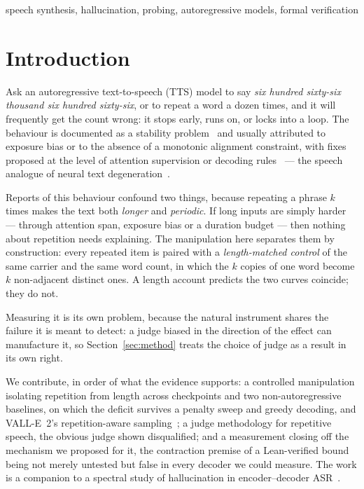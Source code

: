 \documentclass{article}
\begin{document}
\begin{keywords}
speech synthesis, hallucination, probing, autoregressive models,
formal verification
\end{keywords}

\section{Introduction}
\label{sec:intro}

Ask an autoregressive text-to-speech (TTS) model to say \emph{six hundred
sixty-six thousand six hundred sixty-six}, or to repeat a word a dozen times, and
it will frequently get the count wrong: it stops early, runs on, or locks into a
loop. The behaviour is documented as a stability
problem~\cite{song2024ellav,wang2023valle} and usually attributed to
exposure bias or to the absence of a monotonic alignment constraint, with fixes
proposed at the level of attention supervision or decoding
rules~\cite{xin2024ralle,du2024cosyvoice2,chen2024valle2} --- the speech analogue of neural text
degeneration~\cite{holtzman2020curious,welleck2020neural}.

Reports of this behaviour confound two things, because repeating a phrase $k$
times makes the text both \emph{longer} and \emph{periodic}. If long inputs are
simply harder --- through attention span, exposure bias or a duration budget ---
then nothing about repetition needs explaining. The manipulation here separates
them by construction: every repeated item is paired with a
\emph{length-matched control} of the same carrier and the same word count, in
which the $k$ copies of one word become $k$ non-adjacent distinct ones. A
length account predicts the two curves coincide; they do not.

Measuring it is its own problem, because the natural instrument shares the
failure it is meant to detect: a judge biased in the direction of the effect can
manufacture it, so Section~\ref{sec:method} treats the choice of judge as a
result in its own right.

We contribute, in order of what the evidence supports: a controlled manipulation
isolating repetition from length across \NModels{} checkpoints and two
non-autoregressive baselines, on which the deficit survives a penalty sweep and
greedy decoding, and VALL-E~2's repetition-aware
sampling~\cite{chen2024valle2}; a judge methodology for repetitive
speech, the obvious judge shown disqualified; and a measurement closing off the
mechanism we proposed for it, the contraction premise of a Lean-verified bound
being not merely untested but false in every decoder we could measure. The work is a companion to a spectral study of hallucination in
encoder--decoder ASR~\cite{viakhirev2026dispersion}.
\end{document}
